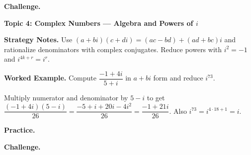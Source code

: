 \documentclass[12pt]{exam}
\begin{document}
\begin{questions}
\textbf{Challenge.}

\newpage

\question
\textbf{Topic 4: Complex Numbers --- Algebra and Powers of $i$}

\textbf{Strategy Notes.} Use $(a+bi)(c+di)=(ac-bd)+(ad+bc)i$ and rationalize denominators with complex conjugates. Reduce powers with $i^2=-1$ and $i^{4k+r}=i^r$.

\textbf{Worked Example.} Compute $\dfrac{-1+4i}{5+i}$ in $a+bi$ form and reduce $i^{73}$.

Multiply numerator and denominator by $5-i$ to get $\dfrac{(-1+4i)(5-i)}{26}=\dfrac{-5+i+20i-4i^2}{26}=\dfrac{-1+21i}{26}$. Also $i^{73}=i^{4\cdot18+1}=i$.

\vspace{0.2cm}
\textbf{Practice.}

\textbf{Challenge.}


\end{questions}
\end{document}
